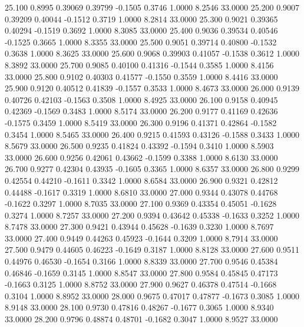   25.100   0.8995   0.39069   0.39799  -0.1505   0.3746   1.0000   8.2546  33.0000
  25.200   0.9007   0.39209   0.40044  -0.1512   0.3719   1.0000   8.2814  33.0000
  25.300   0.9021   0.39365   0.40294  -0.1519   0.3692   1.0000   8.3085  33.0000
  25.400   0.9036   0.39534   0.40546  -0.1525   0.3665   1.0000   8.3355  33.0000
  25.500   0.9051   0.39714   0.40800  -0.1532   0.3638   1.0000   8.3625  33.0000
  25.600   0.9068   0.39903   0.41057  -0.1538   0.3612   1.0000   8.3892  33.0000
  25.700   0.9085   0.40100   0.41316  -0.1544   0.3585   1.0000   8.4156  33.0000
  25.800   0.9102   0.40303   0.41577  -0.1550   0.3559   1.0000   8.4416  33.0000
  25.900   0.9120   0.40512   0.41839  -0.1557   0.3533   1.0000   8.4673  33.0000
  26.000   0.9139   0.40726   0.42103  -0.1563   0.3508   1.0000   8.4925  33.0000
  26.100   0.9158   0.40945   0.42369  -0.1569   0.3483   1.0000   8.5174  33.0000
  26.200   0.9177   0.41169   0.42636  -0.1575   0.3459   1.0000   8.5419  33.0000
  26.300   0.9196   0.41371   0.42864  -0.1582   0.3454   1.0000   8.5465  33.0000
  26.400   0.9215   0.41593   0.43126  -0.1588   0.3433   1.0000   8.5679  33.0000
  26.500   0.9235   0.41824   0.43392  -0.1594   0.3410   1.0000   8.5903  33.0000
  26.600   0.9256   0.42061   0.43662  -0.1599   0.3388   1.0000   8.6130  33.0000
  26.700   0.9277   0.42304   0.43935  -0.1605   0.3365   1.0000   8.6357  33.0000
  26.800   0.9299   0.42554   0.44210  -0.1611   0.3342   1.0000   8.6584  33.0000
  26.900   0.9321   0.42812   0.44488  -0.1617   0.3319   1.0000   8.6810  33.0000
  27.000   0.9344   0.43078   0.44768  -0.1622   0.3297   1.0000   8.7035  33.0000
  27.100   0.9369   0.43354   0.45051  -0.1628   0.3274   1.0000   8.7257  33.0000
  27.200   0.9394   0.43642   0.45338  -0.1633   0.3252   1.0000   8.7478  33.0000
  27.300   0.9421   0.43944   0.45628  -0.1639   0.3230   1.0000   8.7697  33.0000
  27.400   0.9449   0.44263   0.45923  -0.1644   0.3209   1.0000   8.7914  33.0000
  27.500   0.9479   0.44605   0.46223  -0.1649   0.3187   1.0000   8.8128  33.0000
  27.600   0.9511   0.44976   0.46530  -0.1654   0.3166   1.0000   8.8339  33.0000
  27.700   0.9546   0.45384   0.46846  -0.1659   0.3145   1.0000   8.8547  33.0000
  27.800   0.9584   0.45845   0.47173  -0.1663   0.3125   1.0000   8.8752  33.0000
  27.900   0.9627   0.46378   0.47514  -0.1668   0.3104   1.0000   8.8952  33.0000
  28.000   0.9675   0.47017   0.47877  -0.1673   0.3085   1.0000   8.9148  33.0000
  28.100   0.9730   0.47816   0.48267  -0.1677   0.3065   1.0000   8.9340  33.0000
  28.200   0.9796   0.48874   0.48701  -0.1682   0.3047   1.0000   8.9527  33.0000
